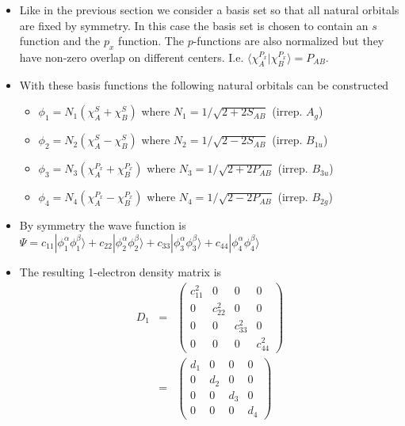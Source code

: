 \documentclass[aip,graphicx]{revtex4-1}
\begin{document}
\begin{itemize}
\item Like in the previous section we consider a basis set so that all natural orbitals are fixed by
         symmetry. In this case the basis set is chosen to contain an $s$ function and the $p_x$ function.
         The $p$-functions are also normalized but they have non-zero overlap on different centers. I.e. 
         $\langle \chi_A^{P_x}|\chi_B^{P_x}\rangle = P_{AB}$. 
\item With these basis functions the following natural orbitals can be constructed
         \begin{itemize}
         \item $\phi_1 = N_1 \left(\chi_A^S + \chi_B^S\right)$ where $N_1 = 1/\sqrt{2+2S_{AB}}$ (irrep. $A_g$)
         \item $\phi_2 = N_2 \left(\chi_A^S - \chi_B^S\right)$ where $N_2 = 1/\sqrt{2-2S_{AB}}$ (irrep. $B_{1u}$)
         \item $\phi_3 = N_3 \left(\chi_A^{P_x} + \chi_B^{P_x}\right)$ where $N_3 = 1/\sqrt{2+2P_{AB}}$ (irrep. $B_{3u}$)
         \item $\phi_4 = N_4 \left(\chi_A^{P_x} - \chi_B^{P_x}\right)$ where $N_4 = 1/\sqrt{2-2P_{AB}}$ (irrep. $B_{2g}$)
         \end{itemize}
\item By symmetry the wave function is 
         $\Psi = c_{11}|\phi_1^\alpha\phi_1^\beta\rangle + c_{22}|\phi_2^\alpha\phi_2^\beta\rangle + c_{33}|\phi_3^\alpha\phi_3^\beta\rangle + c_{44}|\phi_4^\alpha\phi_4^\beta\rangle $
\item The resulting 1-electron density matrix is
         \begin{eqnarray}
         D_{1} &=&
         \left(\begin{matrix}
         c_{11}^2 & 0 & 0 & 0 \\
         0 & c_{22}^2 & 0 & 0 \\
         0 & 0 & c_{33}^2 & 0 \\
         0 & 0 & 0 & c_{44}^2
         \end{matrix}\right) \\
         &=&
         \left(\begin{matrix}
         d_{1} & 0 & 0 & 0 \\
         0 & d_{2} & 0 & 0 \\
         0 & 0 & d_{3} & 0 \\
         0 & 0 & 0 & d_{4} 
         \end{matrix}\right)

\end{eqnarray}
\end{itemize}
\end{document}
